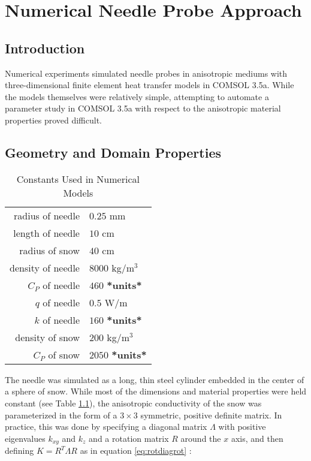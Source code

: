 \chapter{Numerical Needle Probe Approach}
\label{sec:numerical-np}
\bigskip

\section{Introduction} 
\label{sec:numerical-np:introduction}

Numerical experiments simulated needle probes in anisotropic mediums with
three-dimensional finite element heat transfer models in COMSOL 3.5a. While the
models themselves were relatively simple, attempting to automate a parameter
study in COMSOL 3.5a with respect to the anisotropic material properties proved
difficult.

\section{Geometry and Domain Properties}
\label{sec:numerical-np:domain}

\begin{table}[h]
\label{tab:constants}
\centering
\caption{Constants Used in Numerical Models}
\begin{tabular}{r | l}
radius of needle & \(0.25\) mm\\
length of needle & \(10\) cm\\
radius of snow & \(40\) cm\\
\hline
density of needle & \(8000\) kg/\(\textrm{m}^3\)\\
\(C_P\) of needle & \(460\) \textbf{*units*}\\
\(q\) of needle & \(0.5\) W/m\\
\(k\) of needle & \(160\) \textbf{*units*}\\
\hline
density of snow & \(200\) kg/\(\textrm{m}^3\)\\
\(C_P\) of snow & \(2050\) \textbf{*units*}
\end{tabular}
\end{table}

The needle was simulated as a long, thin steel cylinder embedded in the center
of a sphere of snow. While most of the dimensions and material properties were
held constant (see Table \ref{tab:constants}), the anisotropic conductivity of
the snow was parameterized in the form of a \(3\times3\) symmetric, positive
definite matrix.  In practice, this was done by specifying a diagonal matrix
\(\Lambda\) with positive eigenvalues \(k_{xy}\) and \(k_z\) and a rotation
matrix \(R\) around the \(x\) axis, and then defining \(K = R^T\Lambda R\) as in
equation \ref{eq:rotdiagrot} :

